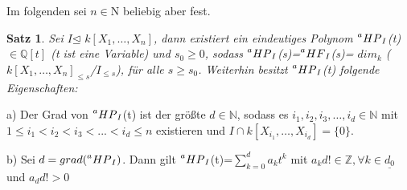 \documentclass{article}
\newtheorem{satz}{Satz}
\newcommand*{\R}{k[X_{1},\ldots,X_{n}]}
\newcommand*{\indx}[2]{{#1}_{#2}}
\newcommand*{\hf}[1]{$\prescript{a}{}{HF}_{#1}$}
\newcommand*{\hp}[1]{$\prescript{a}{}{HP}_{#1}$}
\newcommand*{\kette}[2]{$1\leq {#1}_1<{#1}_2<{#1}_3<...<{#1}_{#2}\leq n$}
\newcommand*{\dkette}[2]{${#1}_1,{#1}_2,{#1}_3,\ldots,{#1}_{#2} \in \mathbb{N}$}
\newcommand*{\ideal}{$I$}
\begin{document}
Im folgenden sei $n \in \mathrm{N}$ beliebig aber fest.

\begin{satz}
	\label{1.2.14}
	Sei  \ideal $\unlhd$ $\R$, dann existiert ein eindeutiges Polynom \hp{I}(t) $\in \mathbb{Q}[t]$ (t ist eine Variable) und $\indx{s}{0}\geq0$,  sodass \hp{I}(s)=\hf{I}(s)= $\indx{dim}{k}$ ($\indx{\R}{\leq s}$/$\indx{I}{\leq s}$), für alle $ s\geq\indx{s}{0}$. Weiterhin besitzt \hp{I}(t) folgende Eigenschaften:	
\end{satz}
\begin{compactenum}
	\item[a)] Der Grad von \hp{I}(t) ist der größte $d \in \mathbb{N}$, sodass es \dkette{i}{d} mit \kette{i}{d} existieren und $I\cap k[X_{{i}_{1}},\ldots,X_{{i}_{d}}]=\{0\}$.
	\item[b)] Sei $d=grad(\textnormal{\hp{I}})$. Dann gilt \hp{I}(t)=$\sum_{k=0}^{d} \indx{a}{k}t^k$ mit $\indx{a}{k}d! \in \mathbb{Z}, \forall k\in \underline{\indx{d}{0}}$ und $\indx{a}{d}d!>0$
\end{compactenum}
\end{document}
